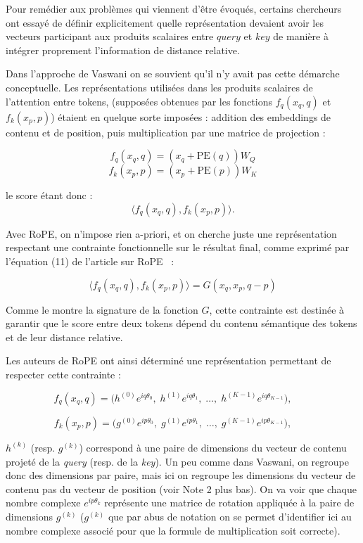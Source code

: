 \documentclass{article}
\begin{document}
Pour remédier aux problèmes qui viennent d'être évoqués, certains chercheurs~\cite{rope} ont essayé de définir explicitement quelle représentation devaient avoir les vecteurs participant aux produits scalaires entre $query$ et $key$ de manière à intégrer proprement l'information de distance relative.

Dans l'approche de Vaswani on se souvient qu'il n'y avait pas cette démarche conceptuelle. Les représentations utilisées dans les produits scalaires de l’attention entre tokens, (supposées obtenues par les fonctions $f_q(x_q, q)$ et $f_k(x_p, p)$) étaient en quelque sorte imposées : addition des embeddings de contenu et de position, puis multiplication par une matrice de projection :

\[
f_q(x_q, q) = (x_q + \mathrm{PE}(q)) W_Q
\]
\[
f_k(x_p, p) = (x_p + \mathrm{PE}(p)) W_K
\]

le score étant donc :
\[
\langle f_q(x_q, q), f_k(x_p, p) \rangle.
\]

Avec RoPE, on n'impose rien a-priori, et on cherche juste une représentation respectant une contrainte fonctionnelle sur le résultat final, comme exprimé par l'équation (11) de l'article sur RoPE~\cite{rope} : 

\[
\langle f_q(x_q, q), f_k(x_p, p) \rangle = G(x_q, x_p, q - p)
\]

Comme le montre la signature de la fonction $G$, cette contrainte est destinée à garantir que le score entre deux tokens dépend du contenu sémantique des tokens et de leur distance relative. 

Les auteurs de RoPE ont ainsi déterminé une représentation permettant de respecter cette contrainte :

\[
f_q(x_q,q)
=
\Big(
h^{(0)} e^{i q \theta_0},
\;
h^{(1)} e^{i q \theta_1},
\;
\ldots,
\;
h^{(K-1)} e^{i q \theta_{K-1}}
\Big),
\qquad
\]

\[
f_k(x_p,p)
=
\Big(
g^{(0)} e^{i p \theta_0},
\;
g^{(1)} e^{i p \theta_1},
\;
\ldots,
\;
g^{(K-1)} e^{i p \theta_{K-1}}
\Big),
\qquad
\]

$h^{(k)}$ (resp. $g^{(k)}$) correspond à une paire de dimensions du vecteur de contenu projeté de la \textit{query} (resp. de la \textit{key}). Un peu comme dans Vaswani, on regroupe donc des dimensions par paire, mais ici on regroupe les dimensions du vecteur de contenu pas du vecteur de position (voir Note 2 plus bas). On va voir que chaque nombre complexe $e^{i p \theta_{k}}$ représente une matrice de rotation appliquée à la paire de dimensions $g^{(k)}$ ($g^{(k)}$ que par abus de notation on se permet d'identifier ici au nombre complexe associé pour que la formule de multiplication soit correcte).
\end{document}
